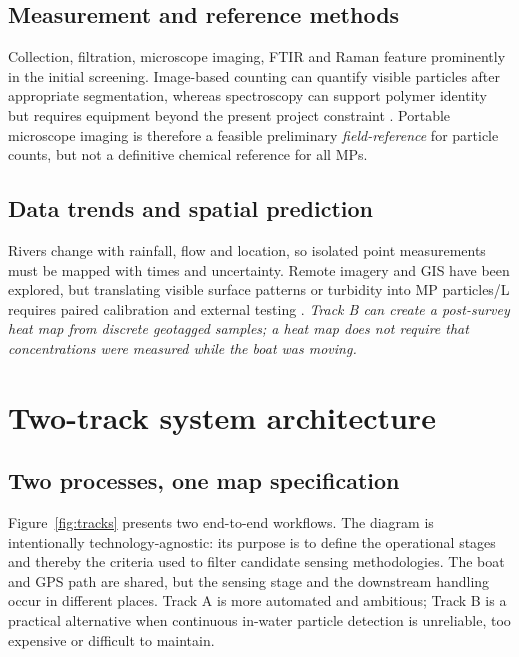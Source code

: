 \documentclass[10pt,a4paper]{article}
\begin{document}
\subsection{Measurement and reference methods}
Collection, filtration, microscope imaging, FTIR and Raman feature prominently in the initial screening. Image-based counting can quantify visible particles after appropriate segmentation, whereas spectroscopy can support polymer identity but requires equipment beyond the present project constraint \cite{Ermolin2024,Lee2022,UrbanCNN2024,MPWE00012}. Portable microscope imaging is therefore a feasible preliminary \emph{field-reference} for particle counts, but not a definitive chemical reference for all MPs.

\subsection{Data trends and spatial prediction}
Rivers change with rainfall, flow and location, so isolated point measurements must be mapped with times and uncertainty. Remote imagery and GIS have been explored, but translating visible surface patterns or turbidity into MP particles/L requires paired calibration and external testing \cite{Chen2021,MPWE04211,MPWE02100}. \emph{Track B can create a post-survey heat map from discrete geotagged samples; a heat map does not require that concentrations were measured while the boat was moving.}

\section{Two-track system architecture}
\subsection{Two processes, one map specification}
Figure~\ref{fig:tracks} presents two end-to-end workflows. The diagram is intentionally technology-agnostic: its purpose is to define the operational stages and thereby the criteria used to filter candidate sensing methodologies. The boat and GPS path are shared, but the sensing stage and the downstream handling occur in different places. Track A is more automated and ambitious; Track B is a practical alternative when continuous in-water particle detection is unreliable, too expensive or difficult to maintain.
\end{document}
